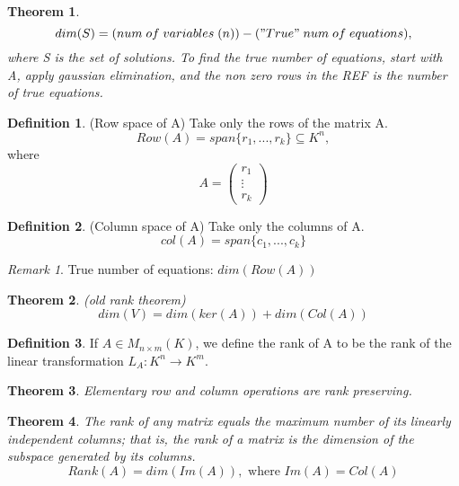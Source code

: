 \documentclass[12pt]{article}
\newtheorem{theorem}{Theorem}[section]
\theoremstyle{definition}
\newtheorem{definition}{Definition}[section]
\theoremstyle{remark}
\newtheorem*{remark}{Remark}
\begin{document}
\begin{theorem}
    $$dim(S)= (num\; of \;variables\; (n)) - ("True" \;num \;of \;equations),$$ where S is the set of solutions. 
    To find the true number of equations, start with A, apply gaussian elimination, and the non zero rows in the REF is 
    the number of true equations.
\end{theorem}

\begin{definition}(Row space of A)
    Take only the rows of the matrix A.
    $$Row(A)  = span\{r_1, ..., r_k \} \subseteq K^n,$$ where 
    $$A = \begin{pmatrix}
        r_1 \\ \vdots \\ r_k 
    \end{pmatrix}$$
\end{definition}
\begin{definition}(Column space of A)
    Take only the columns of A. 
    $$col(A) = span\{ c_1 , ...,c_k\}$$
\end{definition}

\begin{remark}
    True number of equations: $dim(Row(A))$
\end{remark}
\begin{theorem}(old rank theorem)
    $$dim(V) = dim(ker(A)) + dim(Col(A))$$
\end{theorem}

\begin{definition}
    If $A\in M_{n\times m}(K)$, we define the rank of A to be the rank 
    of the linear transformation $L_A: K^n \rightarrow K^m$.
\end{definition}
\begin{theorem}
    Elementary row and column operations are rank preserving.
\end{theorem}

\begin{theorem}
    The rank of any matrix equals the maximum number of its linearly independent columns; that is, the rank of a 
    matrix is the dimension of the subspace generated by its columns.
    $$Rank(A) = dim(Im(A)), \text{ where } Im(A) = Col(A)$$
\end{theorem}
\end{document}
